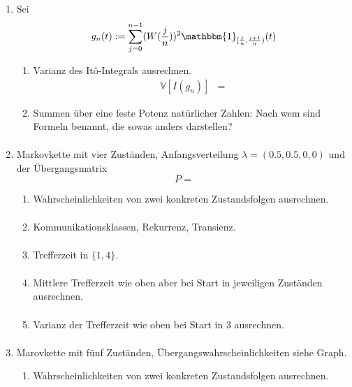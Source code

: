 \documentclass[a4paper,11pt,notitlepage,fullpage]{article}
\newcommand{\Vv}[1]{\mathbb V\left[#1\right]}
\newcommand{\indd}[1]{\mathbbm{1}_{#1}}
\begin{document}
\begin{enumerate}
\item Sei
$$g_n(t) := \sum_{j=0}^{n-1} (W(\frac{j}{n}))^2 \indd{[\frac{j}{n}, \frac{j+1}{n})}(t)$$
\begin{enumerate}
\item Varianz des Itô-Integrals ausrechnen.
\begin{align*}
\Vv{I(g_n)} &=
\end{align*}

\item Summen über eine feste Potenz natürlicher Zahlen: Nach wem sind Formeln benannt, die sowas anders darstellen?
\begin{align*}
\end{align*}
\end{enumerate}

\item Markovkette mit vier Zuständen, Anfangsverteilung $\lambda = (0.5, 0.5, 0, 0)$ und der Übergangsmatrix
$$P=$$
\begin{enumerate}
\item Wahrscheinlichkeiten von zwei konkreten Zustandsfolgen ausrechnen.
\begin{align*}
\end{align*}

\item Kommunikationsklassen, Rekurrenz, Transienz.
\begin{align*}
\end{align*}

\item Trefferzeit in $\{1, 4\}$.
\begin{align*}
\end{align*}

\item Mittlere Trefferzeit wie oben aber bei Start in jeweiligen Zuständen ausrechnen.
\begin{align*}
\end{align*}

\item Varianz der Trefferzeit wie oben bei Start in $3$ ausrechnen.
\begin{align*}
\end{align*}
\end{enumerate}

\item Marovkette mit fünf Zuständen, Übergangswahrscheinlichkeiten siehe Graph.
\begin{enumerate}
\item Wahrscheinlichkeiten von zwei konkreten Zustandsfolgen ausrechnen.
\begin{align*}
\end{align*}


\end{enumerate}
\end{enumerate}
\end{document}
